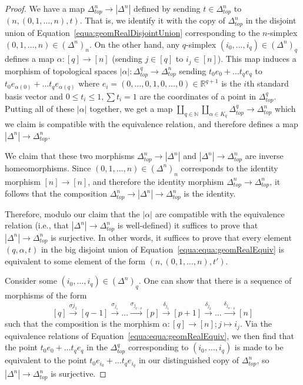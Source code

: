 \documentclass[a4paper]{amsart}
\numberwithin{figure}{section}
\theoremstyle{theorem}
\theoremstyle{definition}
\newcommand{\NN}{\mathbb{N}}
\newcommand{\RR}{\mathbb{R}}
\begin{document}
\begin{proof}
We have a map $\Delta^n_{top} {\to} |\Delta^n|$ defined by sending $t \in \Delta^n_{top}$ to $(n, (0, 1, \dots, n), t)$. That is, we identify it with the copy of $\Delta^n_{top}$ in the disjoint union of Equation~\eqref{equa:geomRealDisjointUnion} corresponding to the $n$-simplex $(0, 1, \dots, n) \in (\Delta^n)_n$. On the other hand, any $q$-simplex $(i_0, \dots, i_q) \in (\Delta^n)_q$ defines a map $\alpha: [q] \to [n]$ (sending $j \in [q]$ to $i_j \in [n]$). This map induces a morphism of topological spaces $|\alpha|: \Delta^q_{top} \to \Delta^n_{top}$ sending $t_0e_0 + \dots t_qe_q$ to $t_0e_{\alpha(0)} + \dots t_qe_{\alpha(q)}$ where $e_i = (0, \dots, 0, 1, 0, \dots, 0) \in \RR^{q+1}$ is the $i$th standard basis vector and $0 \leq t_i \leq 1, \sum t_i = 1$ are the coordinates of a point in $\Delta^q_{top}$. Putting all of these $|\alpha|$ together, we get a map $\coprod_{q \in \NN} \coprod_{\alpha \in K_q} \Delta^q_{top} \to \Delta^n_{top}$ which we claim is compatible with the equivalence relation, and therefore defines a map $|\Delta^n| {\to} \Delta_{top}^n$.

We claim that these two morphisms $\Delta^n_{top} {\to} |\Delta^n|$ and $|\Delta^n| {\to} \Delta_{top}^n$ are inverse homeomorphisms. Since $(0, 1, \dots, n) \in (\Delta^n)_n$ corresponds to the identity morphism $[n] \to [n]$, and therefore the identity morphism $\Delta^n_{top} \to \Delta^n_{top}$, it follows that the composition $\Delta^n_{top} {\to} |\Delta^n| {\to} \Delta^n_{top}$ is the identity.

Therefore, modulo our claim that the $|\alpha|$ are compatible with the equivalence relation (i.e., that $|\Delta^n| {\to} \Delta^n_{top}$ is well-defined) it suffices to prove that $|\Delta^n| {\to} \Delta^n_{top}$ is surjective. In other words, it suffices to prove that every element $(q, \alpha, t)$ in the big disjoint union of Equation~\ref{equa:equa:geomRealEquiv} is equivalent to some element of the form $(n, (0, 1,\dots, n), t')$. 

Consider some $(i_0, \dots, i_q) \in (\Delta^n)_q$. One can show that there is a sequence of morphisms of the form 
\[ [q] \stackrel{\sigma{j_1}}{\to} [q-1] \stackrel{\sigma_{j_1}}{\to} \dots \stackrel{\sigma_{j_{q-p}}}{\to} [p] \stackrel{\delta_{j_1}}{\to} [p+1] \stackrel{\delta_{j_2}}{\to} \dots \stackrel{\delta_{j_{n-p}}}{\to} [n] \]
such that the composition is the morphism $\alpha: [q] {\to} [n]; j {\mapsto} i_j$. Via the equivalence relations of Equation~\ref{equa:equa:geomRealEquiv}, we then find that the point $t_0e_0 + \dots t_qe_q$ in the $\Delta^q_{top}$ corresponding to $(i_0, \dots, i_q)$ is made to be equivalent to the point $t_0e_{i_0} + \dots t_qe_{i_q}$ in our distinguished copy of $\Delta^n_{top}$, so $|\Delta^n| {\to} \Delta^n_{top}$ is surjective.
\end{proof}
\end{document}
